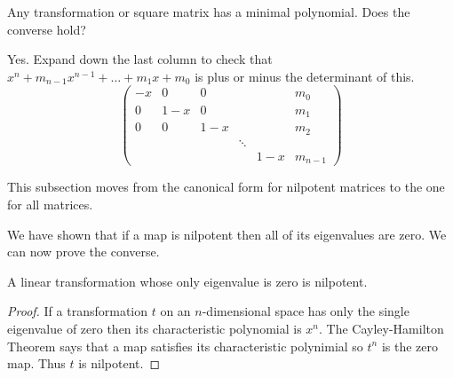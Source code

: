 \begin{exercises}
  \item
    Any transformation or square matrix has a minimal polynomial.
    Does the converse hold?
    \begin{answer}
      Yes.
      Expand down the last column to check that
      \( x^n+m_{n-1}x^{n-1}+\dots+m_1x+m_0 \) is plus or minus the
      determinant of this.
      \begin{equation*}
         \begin{pmatrix}
            -x  &0  &0  &      &    &m_0    \\
             0  &1-x&0  &      &    &m_1    \\
             0  &0  &1-x&      &    &m_2    \\
                &   &   &\ddots             \\
                &   &   &      &1-x &m_{n-1}
         \end{pmatrix}
      \end{equation*} 
     \end{answer}
\end{exercises}












This subsection moves from the canonical form for nilpotent matrices to
the one for all matrices.

We have shown that if a map is nilpotent then all of its eigenvalues are zero.
We can now prove the converse.

\begin{lemma}
  A linear transformation whose only eigenvalue is zero is nilpotent.
\end{lemma}

\begin{proof}
If a transformation \( t \) on an
\( n \)-dimensional space has only the single eigenvalue of zero 
then its characteristic polynomial is \( x^n \). 
The Cayley-Hamilton Theorem says that a map satisfies its
characteristic polynimial so \( t^n \) is the zero map.
Thus $t$ is nilpotent.
\end{proof}

